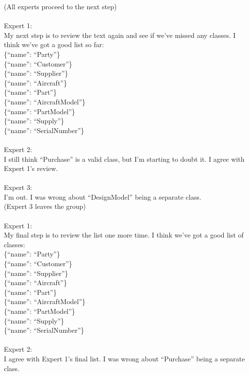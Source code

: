 {(All experts proceed to the next step) \\~\\
Expert 1: \\
My next step is to review the text again and see if we've missed any classes. I think we've got a good list so far: \\
\{``name'': ``Party''\} \\
\{``name'': ``Customer''\} \\
\{``name'': ``Supplier''\} \\
\{``name'': ``Aircraft''\} \\
\{``name'': ``Part''\} \\
\{``name'': ``AircraftModel''\} \\
\{``name'': ``PartModel''\} \\
\{``name'': ``Supply''\} \\
\{``name'': ``SerialNumber''\} \\~\\
Expert 2: \\
I still think ``Purchase'' is a valid class, but I'm starting to doubt it. I agree with Expert 1's review. \\~\\
Expert 3: \\
I'm out. I was wrong about ``DesignModel'' being a separate class. \\
(Expert 3 leaves the group) \\~\\
Expert 1: \\
My final step is to review the list one more time. I think we've got a good list of classes: \\
\{``name'': ``Party''\} \\
\{``name'': ``Customer''\} \\
\{``name'': ``Supplier''\} \\
\{``name'': ``Aircraft''\} \\
\{``name'': ``Part''\} \\
\{``name'': ``AircraftModel''\} \\
\{``name'': ``PartModel''\} \\
\{``name'': ``Supply''\} \\
\{``name'': ``SerialNumber''\} \\~\\
Expert 2: \\
I agree with Expert 1's final list. I was wrong about ``Purchase'' being a separate class.} \\

